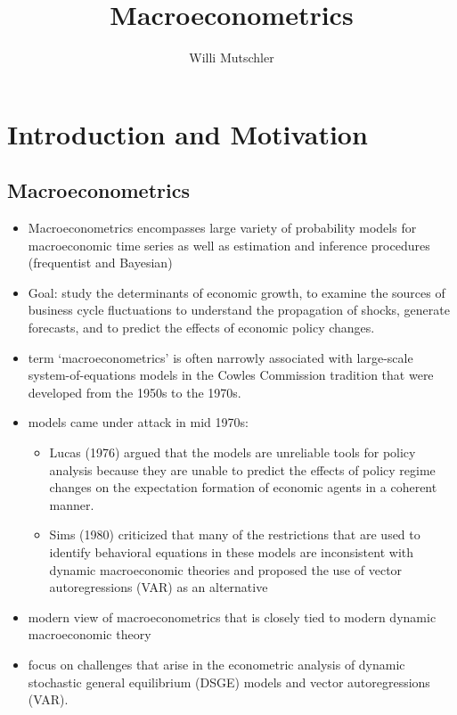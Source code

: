 \documentclass[]{scrartcl}
\title{Macroeconometrics}
\author{Willi Mutschler}
\begin{document}
\maketitle

\begin{abstract}

\end{abstract}

\section{Introduction and Motivation}
\subsection{Macroeconometrics}
\begin{itemize}
	\item Macroeconometrics encompasses large variety of probability models for macroeconomic time series as well as estimation and inference procedures (frequentist and Bayesian)
	\item Goal: study the determinants of economic growth, to examine the sources of business cycle fluctuations to understand the propagation of shocks, generate forecasts, and to predict the effects of economic policy changes. 
	\item term ‘macroeconometrics’ is often narrowly associated with large-scale system-of-equations models in the Cowles Commission tradition that were developed from the 1950s to the 1970s. 
	\item models came under attack in mid 1970s: 
	\begin{itemize}
		\item Lucas (1976) argued that the models are unreliable tools for policy analysis because they are unable to predict the effects of policy regime changes on the expectation formation of economic agents in a coherent manner. 
		\item Sims (1980) criticized that many of the restrictions that are used to identify behavioral equations in these models are inconsistent with dynamic macroeconomic 	theories and proposed the use of vector autoregressions (VAR) as an alternative
	\end{itemize}
	\item modern view of macroeconometrics that is closely tied to modern dynamic macroeconomic theory
	\item focus on challenges that arise in the econometric analysis of dynamic stochastic general equilibrium (DSGE) models and vector autoregressions (VAR). 
\end{itemize}
\end{document}
